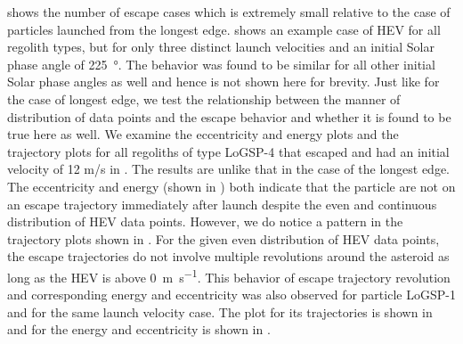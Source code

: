  shows the number of escape cases which is extremely small relative to the case of particles launched from the longest edge.  shows an example case of \gls{HEV} for all regolith types, but for only three distinct launch velocities and an initial Solar phase angle of \SI{225}{\degree}. The behavior was found to be similar for all other initial Solar phase angles as well and hence is not shown here for brevity. Just like for the case of longest edge, we test the relationship between the manner of distribution of data points and the escape behavior and whether it is found to be true here as well. We examine the eccentricity and energy plots and the trajectory plots for all regoliths of type LoGSP-4 that escaped and had an initial velocity of 12 m/s in . The results are unlike that in the case of the longest edge. The eccentricity and energy (shown in ) both indicate that the particle are not on an escape trajectory immediately after launch despite the even and continuous distribution of \gls{HEV} data points. However, we do notice a pattern in the trajectory plots shown in . For the given even distribution of \gls{HEV} data points, the escape trajectories do not involve multiple revolutions around the asteroid as long as the \gls{HEV} is above \SI{0}{\metre\per\second}. This behavior of escape trajectory revolution and corresponding energy and eccentricity was also observed for particle LoGSP-1 and for the same launch velocity case. The plot for its trajectories is shown in  and for the energy and eccentricity is shown in .
